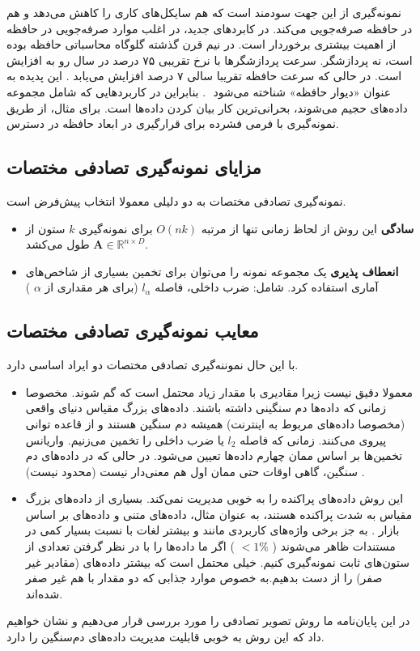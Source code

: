 نمونه‌گیری از این جهت سودمند است که هم سایکل‌های کاری 
را کاهش ‌می‌دهد و هم در حافظه صرفه‌جویی می‌کند. در کابردهای جدید، در اغلب موارد صرفه‌جویی در حافظه از اهمیت بیشتری برخوردار است. در نیم قرن گذشته گلوگاه‌ محاسباتی حافظه بوده است، نه پردازشگر. سرعت پردازشگرها با نرخ تقریبی ۷۵ درصد در سال رو به افزایش است. در حالی که سرعت حافظه تقریبا سالی ۷ درصد افزایش می‌یابد
\cite{litez139}
. این پدیده به عنوان «دیوار حافظه»%
شناخته می‌شود
‌\cite{litez139, litez168}
. بنابراین در کاربردهایی که شامل مجموعه داده‌های حجیم می‌شوند، بحرانی‌ترین کار بیان کردن داده‌ها است. برای مثال،
از طریق نمونه‌گیری با فرمی فشرده برای قرارگیری در ابعاد حافظه در دسترس.


\subsection{مزایای نمونه‌گیری تصادفی مختصات}
نمونه‌گیری تصادفی مختصات به دو دلیلی معمولا انتخاب پیش‌فرض است.

\begin{itemize}
\item
\textbf{سادگی}
این روش از لحاظ زمانی تنها از مرتبه 
$O(nk)$
برای نمونه‌گیری 
$k$ 
ستون از 
$\mathbf{A} \in \mathbb{R}^{n \times D}$
طول می‌کشد.
\item
\textbf{انعطاف پذیری}
یک مجموعه نمونه را می‌توان برای تخمین بسیاری از شاخص‌های آماری استفاده کرد. شامل: ضرب داخلی، فاصله
$l_\alpha$
(برای هر مقداری از 
$\alpha$
)
\end{itemize}

\subsection{معایب نمونه‌گیری تصادفی مختصات}
با این حال نموننه‌گیری تصادفی مختصات دو ایراد اساسی دارد.
\begin{itemize}
\item
معمولا دقیق نیست زیرا مقادیری با مقدار زیاد محتمل است که گم شوند. مخصوصا زمانی که داده‌ها دم سنگینی داشته باشند. داده‌های بزرگ مقیاس دنیای واقعی (مخصوصا داده‌های مربوط به اینترنت) همیشه دم  سنگین هستند و از قاعده توانی پیروی می‌کنند.
\cite{litez142,litez66, litez53, litez111}
زمانی که فاصله 
$l_2$
یا ضرب داخلی را تخمین می‌زنیم. واریانس تخمین‌ها بر اساس ممان چهارم داده‌ها تعیین می‌شود. در حالی که در داده‌های دم سنگین، گاهی اوقات حتی ممان اول هم معنی‌دار نیست (محدود نیست)
\cite{litez142}
.
\item
این روش داده‌های پراکنده را به خوبی مدیریت نمی‌کند. بسیاری از داده‌های بزرگ مقیاس به شدت پراکنده هستند، به عنوان مثال، داده‌های متنی 
\cite{litez60}
و داده‌های بر اساس بازار
\cite{litez7, litez158}
. به جز برخی واژه‌های کاربردی مانند 
 و 
بیشتر لغات با نسبت بسیار کمی در مستندات ظاهر می‌شوند (
$<1\%$
)
اگر ما داده‌ها را با در نظر گرفتن تعدادی از ستون‌های ثابت نمونه‌گیری کنیم. خیلی محتمل است که بیشتر داده‌های (مقادیر غیر صفر) را از دست بدهیم.به خصوص موارد جذابی که دو مقدار با هم غیر صفر شده‌اند.
\end{itemize}
در این پایان‌نامه ما روش تصویر تصادفی را مورد بررسی قرار می‌دهیم و نشان خواهیم داد که این روش به خوبی قابلیت مدیریت داده‌های دم‌سنگین را دارد.

